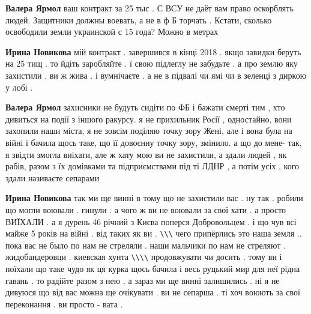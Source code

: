 \begin{itemize}
\begin{itemize}
 
\textbf{Валера Ярмол} ваш контракт за 25 тыс . С ВСУ не даёт вам право оскорблять людей. Защитники должны воевать, а не в ф Б торчать . Кстати, сколько освободили земли украинской с 15 года? Можно в метрах

 
\textbf{Ирина Новикова} мій контракт . завершився в кінці 2018 . якщо завидки беруть на 25 тищ . то йдіть заробляйте . ї свою підлеглу не забудьте . а про землю яку захистили . ви ж жива . і вумнічаєте . а не в підвалі чи ямі чи в зеленці з диркою у лобі .

 
\textbf{Валера Ярмол} захисники не будуть сидіти по ФБ і бажати смерті тим , хто дивиться на події з іншого ракурсу. я не прихильник Росії , одностайно, вони захопили наши міста, я не зовсім поділяю точку зору Жені, але і вона була на війні і бачила щось таке, що її довоєнну точку зору, змінило. а що до мене- так, я звідти змогла виіхати, але ж хату мою ви не захистили, а здали людей , як рабів, разом з їх домівками та підприємствами під ті ЛДНР , а потім усіх , кого здали називаєте сепарами

 
\textbf{Ирина Новикова} так ми ще винні в тому що не захистили вас . ну так .
робили що могли воювали . гинули . а чого ж ви не воювали за свої хати . а
просто ВИЇХАЛИ . а я дурень 46 річний з Києва поперся Добровольцем . і що чув
всі майже 5 років на війні . від таких як ви . \verb|\\\| чего припёрлись это наша
земля .. пока вас не было по нам не стреляли . наши мальчики по нам не стреляют
. жидобандеровци . киевская хунта \verb|\\\\| продовжувати чи досить . тому ви і
поїхали що таке чудо як ця курка щось бачила і весь руцький мир для неї рідна
гавань . то радійте разом з нею . а зараз ми ще винні залишились . ні я не
дивуюся що від вас можна ще очікувати . ви не сепарша . ті хоч воюють за свої
переконання . ви просто - вата .


\end{itemize}
\end{itemize}
